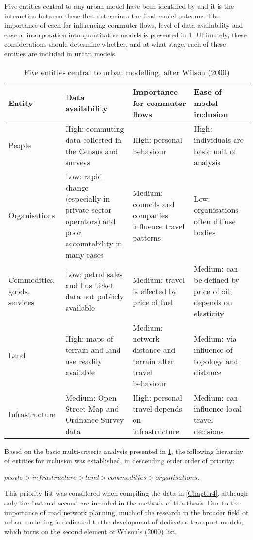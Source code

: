 Five entities central to any urban model have been identified
by \citet{wilson2000complex} and
it is the interaction between these that determines
the final model outcome. The importance of each
for influencing commuter flows, level of data availability and
ease of incorporation into quantitative models is presented in
\cref{t:entities}. Ultimately, these considerations should determine
whether, and at what stage, each of these entities are included in urban models.
\begin{table}[htbp]
\caption{Five entities central to urban modelling, after Wilson (2000)}
\begin{tabular}{p{2cm}p{3.5cm}p{3.5cm}p{3.5cm}} \toprule
Entity & Data availability & Importance for commuter flows & Ease of model inclusion \\ \midrule
People & High: commuting data collected in the Census and surveys & High: personal behaviour & High: individuals are basic unit of analysis \\
Organisations & Low: rapid change (especially in private sector operators) and poor accountability in many cases & Medium: councils and companies influence travel patterns & Low: organisations often
diffuse bodies \\
Commodities, goods, services & Low: petrol sales and bus ticket data not publicly available & Medium: travel is effected by price of fuel & Medium: can be defined by price of oil; depends on
elasticity \\
Land & High: maps of terrain and land use readily available & Medium: network distance and terrain alter travel behaviour & Medium: via influence of topology and distance \\
Infrastructure & Medium: Open Street Map and Ordnance Survey data & High: personal travel depends on infrastructure & Medium: can influence local travel decisions \\
\bottomrule
\end{tabular}
\label{t:entities}
\end{table}
Based on the basic multi-criteria analysis presented in
\cref{t:entities}, the following
hierarchy of entities for inclusion was established, in descending order
order of priority:

$people > infrastructure > land > commodities > organisations$.

This priority list was considered when 
compiling the data in \cref{Chapter4},
although only the first and second are
included in the methods of this thesis. Due to the importance of road network
planning, much of the research in the broader field of urban modelling is
dedicated to the development of dedicated transport models, which focus on
the second element of Wilson's (2000) list.

